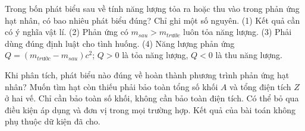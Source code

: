 \begin{ex}
Trong bốn phát biểu sau về tính năng lượng tỏa ra hoặc thu vào trong phản ứng hạt nhân, có bao nhiêu phát biểu đúng? Chỉ ghi một số nguyên. (1) Kết quả cần có ý nghĩa vật lí. (2) Phản ứng có $m_{sau}\gt m_{trước}$ luôn tỏa năng lượng. (3) Phải dùng đúng định luật cho tình huống. (4) Năng lượng phản ứng $Q=(m_{trước}-m_{sau})c^2$; $Q>0$ là tỏa năng lượng, $Q<0$ là thu năng lượng.
\end{ex}

\begin{ex}
Khi phân tích, phát biểu nào đúng về hoàn thành phương trình phản ứng hạt nhân?
\choice
{\True Muốn tìm hạt còn thiếu phải bảo toàn tổng số khối $A$ và tổng điện tích $Z$ ở hai vế.}
{Chỉ cần bảo toàn số khối, không cần bảo toàn điện tích.}
{Có thể bỏ qua điều kiện áp dụng và đơn vị trong mọi trường hợp.}
{Kết quả của bài toán không phụ thuộc dữ kiện đã cho.}
\end{ex}

